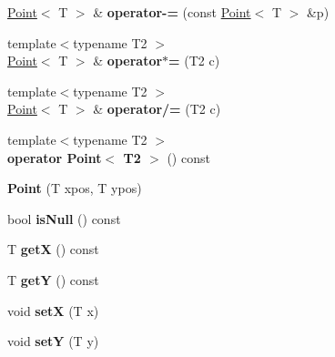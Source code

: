 \begin{DoxyCompactItemize}
\item 
\hypertarget{class_point_a97420680779305d8ff418154432d18e6}{
\hyperlink{class_point}{Point}$<$ T $>$ \& {\bfseries operator-\/=} (const \hyperlink{class_point}{Point}$<$ T $>$ \&p)}
\label{class_point_a97420680779305d8ff418154432d18e6}

\item 
\hypertarget{class_point_af661fc31fd0d5e68272dd0b5fd89c098}{
{\footnotesize template$<$typename T2 $>$ }\\\hyperlink{class_point}{Point}$<$ T $>$ \& {\bfseries operator$\ast$=} (T2 c)}
\label{class_point_af661fc31fd0d5e68272dd0b5fd89c098}

\item 
\hypertarget{class_point_a1eea2586fd60dc3afd91fa48a2243d34}{
{\footnotesize template$<$typename T2 $>$ }\\\hyperlink{class_point}{Point}$<$ T $>$ \& {\bfseries operator/=} (T2 c)}
\label{class_point_a1eea2586fd60dc3afd91fa48a2243d34}

\item 
\hypertarget{class_point_ae81e26af57b63fc89ed704b1035cf149}{
{\footnotesize template$<$typename T2 $>$ }\\{\bfseries operator Point$<$ T2 $>$} () const }
\label{class_point_ae81e26af57b63fc89ed704b1035cf149}

\item 
\hypertarget{class_point_afee21757359d199f4c69d9701e1dc7e2}{
{\bfseries Point} (T xpos, T ypos)}
\label{class_point_afee21757359d199f4c69d9701e1dc7e2}

\item 
\hypertarget{class_point_ac9b271484c83c7e1d9a6f07ab11f3f68}{
bool {\bfseries isNull} () const }
\label{class_point_ac9b271484c83c7e1d9a6f07ab11f3f68}

\item 
\hypertarget{class_point_ae414e3bdd4f00190e7c4a999e9020f6c}{
T {\bfseries getX} () const }
\label{class_point_ae414e3bdd4f00190e7c4a999e9020f6c}

\item 
\hypertarget{class_point_a6b5641f2ef6c44b88f14276150dce919}{
T {\bfseries getY} () const }
\label{class_point_a6b5641f2ef6c44b88f14276150dce919}

\item 
\hypertarget{class_point_a0e395ed682dce1b506117001ad7b4359}{
void {\bfseries setX} (T x)}
\label{class_point_a0e395ed682dce1b506117001ad7b4359}

\item 
\hypertarget{class_point_af95aee5daa3bc93b4eb31867f4be5a2b}{
void {\bfseries setY} (T y)}
\label{class_point_af95aee5daa3bc93b4eb31867f4be5a2b}


\end{DoxyCompactItemize}

